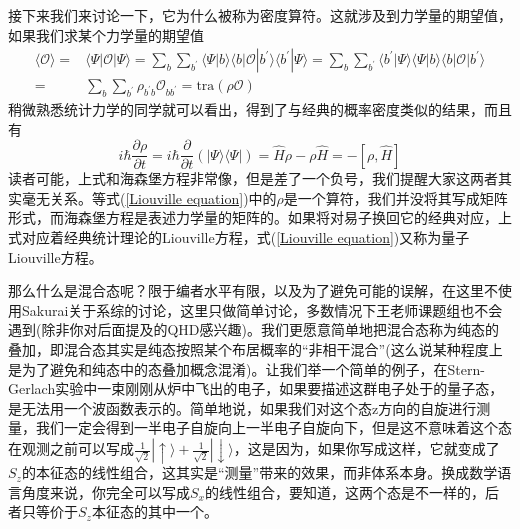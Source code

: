 \documentclass[12pt,a4paper,openany,twoside]{book}
\numberwithin{equation}{section}
\begin{document}
  接下来我们来讨论一下，它为什么被称为密度算符。这就涉及到力学量的期望值，如果我们求某个力学量的期望值
  \begin{equation}
    \begin{aligned}
      \langle\mathcal{O}\rangle=&\langle \Psi | \mathcal{O} | \Psi \rangle=\sum_{b}\sum_{b^\prime} \langle \Psi | b \rangle \langle b | \mathcal{O} | b^\prime \rangle \langle b^\prime | \Psi \rangle=\sum_{b}\sum_{b^\prime} \langle b^\prime | \Psi \rangle \langle \Psi | b \rangle \langle b | \mathcal{O} | b^\prime \rangle \\=&\sum_{b}\sum_{b^\prime}\rho_{b^\prime b}\mathcal{O}_{b b^\prime}=\text{tra}(\rho \mathcal{O})
    \end{aligned}
  \end{equation}
  稍微熟悉统计力学的同学就可以看出，得到了与经典的概率密度类似的结果，而且有
  \begin{equation}
    i \hbar \frac{\partial \rho}{\partial t}=i \hbar \frac{\partial}{\partial t} \left(| \Psi \rangle \langle \Psi |\right)=\hat{H}\rho-\rho\hat{H}=-\left[\rho,\hat{H}\right]
    \label{Liouville equation}
  \end{equation}
  读者可能，上式和海森堡方程非常像，但是差了一个负号，我们提醒大家这两者其实毫无关系。等式(\ref{Liouville equation})中的$\rho$是一个算符，我们并没将其写成矩阵形式，而海森堡方程是表述力学量的矩阵的。如果将对易子换回它的经典对应，上式对应着经典统计理论的Liouville方程，式(\ref{Liouville equation})又称为量子Liouville方程。

  那么什么是混合态呢？限于编者水平有限，以及为了避免可能的误解，在这里不使用Sakurai关于系综的讨论\cite{J.J.Sakurai2010}，这里只做简单讨论，多数情况下王老师课题组也不会遇到(除非你对后面提及的QHD感兴趣)。我们更愿意简单地把混合态称为纯态的叠加，即混合态其实是纯态按照某个布居概率的“非相干混合”(这么说某种程度上是为了避免和纯态中的态叠加概念混淆)。让我们举一个简单的例子，在Stern-Gerlach实验中一束刚刚从炉中飞出的电子，如果要描述这群电子处于的量子态，是无法用一个波函数表示的。简单地说，如果我们对这个态z方向的自旋进行测量，我们一定会得到一半电子自旋向上一半电子自旋向下，但是这不意味着这个态在观测之前可以写成$\frac{1}{\sqrt{2}} | \uparrow \rangle +\frac{1}{\sqrt{2}} | \downarrow \rangle$，这是因为，如果你写成这样，它就变成了$S_z$的本征态的线性组合，这其实是“测量”带来的效果，而非体系本身。换成数学语言角度来说，你完全可以写成$S_x$的线性组合，要知道，这两个态是不一样的，后者只等价于$S_z$本征态的其中一个。
\end{document}
